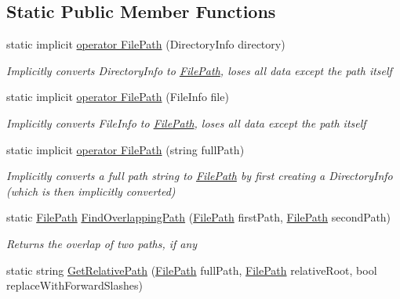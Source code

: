 \subsection*{Static Public Member Functions}
\begin{DoxyCompactItemize}
\item 
static implicit \hyperlink{class_cloud_api_public_1_1_model_1_1_file_path_a207de9e47985b6aebd7ff55402cad10c}{operator File\-Path} (Directory\-Info directory)
\begin{DoxyCompactList}\small\item\em Implicitly converts Directory\-Info to \hyperlink{class_cloud_api_public_1_1_model_1_1_file_path}{File\-Path}, loses all data except the path itself \end{DoxyCompactList}\item 
static implicit \hyperlink{class_cloud_api_public_1_1_model_1_1_file_path_a487405c44f1fdfb000153cff0b5fb82c}{operator File\-Path} (File\-Info file)
\begin{DoxyCompactList}\small\item\em Implicitly converts File\-Info to \hyperlink{class_cloud_api_public_1_1_model_1_1_file_path}{File\-Path}, loses all data except the path itself \end{DoxyCompactList}\item 
static implicit \hyperlink{class_cloud_api_public_1_1_model_1_1_file_path_a02e6124740c2197434373db93c843932}{operator File\-Path} (string full\-Path)
\begin{DoxyCompactList}\small\item\em Implicitly converts a full path string to \hyperlink{class_cloud_api_public_1_1_model_1_1_file_path}{File\-Path} by first creating a Directory\-Info (which is then implicitly converted) \end{DoxyCompactList}\item 
static \hyperlink{class_cloud_api_public_1_1_model_1_1_file_path}{File\-Path} \hyperlink{class_cloud_api_public_1_1_model_1_1_file_path_a546fa862491a9ac6f9f27fefcdcc8e70}{Find\-Overlapping\-Path} (\hyperlink{class_cloud_api_public_1_1_model_1_1_file_path}{File\-Path} first\-Path, \hyperlink{class_cloud_api_public_1_1_model_1_1_file_path}{File\-Path} second\-Path)
\begin{DoxyCompactList}\small\item\em Returns the overlap of two paths, if any \end{DoxyCompactList}\item 
static string \hyperlink{class_cloud_api_public_1_1_model_1_1_file_path_ae59cc87c9025226cd9c00578c4b7b453}{Get\-Relative\-Path} (\hyperlink{class_cloud_api_public_1_1_model_1_1_file_path}{File\-Path} full\-Path, \hyperlink{class_cloud_api_public_1_1_model_1_1_file_path}{File\-Path} relative\-Root, bool replace\-With\-Forward\-Slashes)

\end{DoxyCompactItemize}
